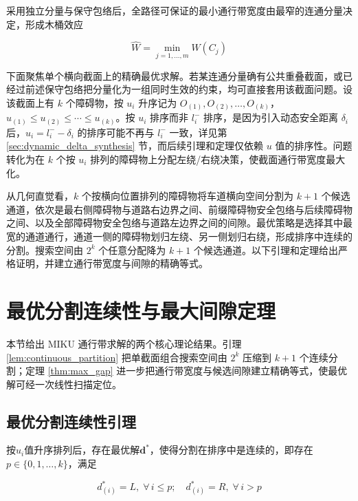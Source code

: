 采用独立分量与保守包络后，全路径可保证的最小通行带宽度由最窄的连通分量决定，形成木桶效应

\begin{equation}
    \widehat{W} = \min_{j=1,\ldots,m} \widehat{W}(C_j)
    \label{eq:global_width}
\end{equation}

下面聚焦单个横向截面上的精确最优求解。若某连通分量确有公共重叠截面，或已经过前述保守包络把分量化为一组同时生效的约束，均可直接套用该截面问题。设该截面上有 $k$ 个障碍物，按 $u_i$ 升序记为 $O_{(1)}, O_{(2)}, \ldots, O_{(k)}$，$u_{(1)} \leq u_{(2)} \leq \cdots \leq u_{(k)}$。按 $u_i$ 排序而非 $l_i^{-}$ 排序，是因为引入动态安全距离 $\delta_i$ 后，$u_i = l_i^{-} - \delta_i$ 的排序可能不再与 $l_i^{-}$ 一致，详见第 \ref{sec:dynamic_delta_synthesis} 节，而后续引理和定理仅依赖 $u$ 值的排序性。问题转化为在 $k$ 个按 $u_i$ 排列的障碍物上分配左绕/右绕决策，使截面通行带宽度最大化。

从几何直觉看，$k$ 个按横向位置排列的障碍物将车道横向空间分割为 $k+1$ 个候选通道，依次是最右侧障碍物与道路右边界之间、前缀障碍物安全包络与后续障碍物之间、以及全部障碍物安全包络与道路左边界之间的间隙。最优策略是选择其中最宽的通道通行，通道一侧的障碍物划归左绕、另一侧划归右绕，形成排序中连续的分割。搜索空间由 $2^k$ 个任意分配降为 $k+1$ 个候选通道。以下引理和定理给出严格证明，并建立通行带宽度与间隙的精确等式。

\section{最优分割连续性与最大间隙定理}
本节给出 MIKU 通行带求解的两个核心理论结果。引理 \ref{lem:continuous_partition} 把单截面组合搜索空间由 $2^k$ 压缩到 $k+1$ 个连续分割；定理 \ref{thm:max_gap} 进一步把通行带宽度与候选间隙建立精确等式，使最优解可经一次线性扫描定位。

\subsection{最优分割连续性引理}
\begin{lemma}[最优分割的连续性]
\label{lem:continuous_partition}
按$u_i$值升序排列后，存在最优解$\mathbf{d}^{*}$，使得分割在排序中是连续的，即存在$p \in \{0, 1, \ldots, k\}$，满足

\begin{equation}
    d_{(i)}^{*} = L, \;\forall\, i \leq p; \quad d_{(i)}^{*} = R, \;\forall\, i > p
    \label{eq:continuous_partition}
\end{equation}
\end{lemma}

